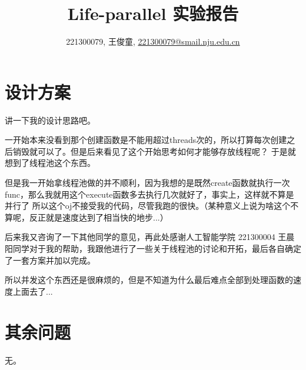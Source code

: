 \documentclass[a4paper,UTF8]{article}
\numberwithin{equation}{section}
\theoremstyle{definition}
\begin{document}
\title{Life-parallel 实验报告}
\author{221300079, 王俊童, \href{mailto:221300079@smail.nju.edu.cn}{221300079@smail.nju.edu.cn}}
\maketitle

    

    \section{设计方案}

    讲一下我的设计思路吧。

    一开始本来没看到那个创建函数是不能用超过threads次的，所以打算每次创建之后销毁就可以了。但是后来看见了这个开始思考如何才能够存放线程呢？
    于是就想到了线程池这个东西。

    但是我一开始拿线程池做的并不顺利，因为我想的是既然create函数就执行一次func，那么我就用这个execute函数多去执行几次就好了，事实上，这样就不算是并行了
    所以这个oj不接受我的代码，尽管我跑的很快。（某种意义上说为啥这个不算呢，反正就是速度达到了相当快的地步...）

    后来我又咨询了一下其他同学的意见，再此处感谢人工智能学院 221300004 王晨阳同学对于我的帮助，我跟他进行了一些关于线程池的讨论和开拓，最后各自确定了一套方案并加以完成。

    所以并发这个东西还是很麻烦的，但是不知道为什么最后难点全部到处理函数的速度上面去了...
    
    \section{其余问题}

    无。
\end{document}

